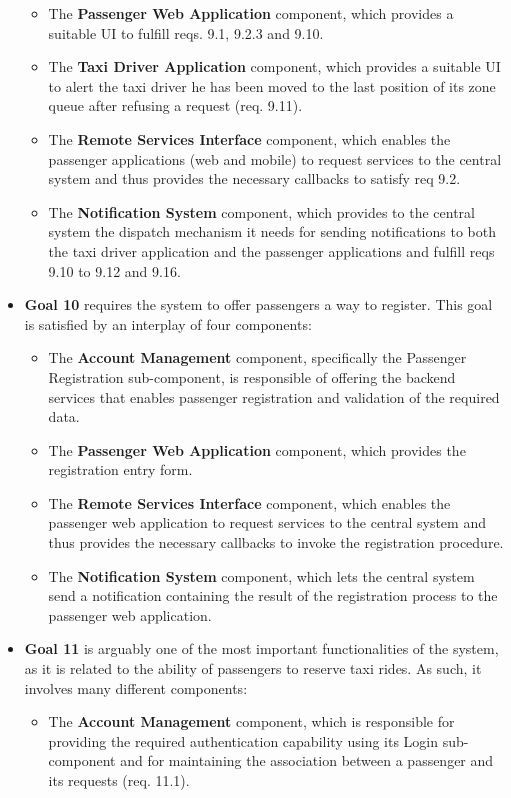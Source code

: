 \begin{itemize}
\begin{itemize}
		\item The \textbf{Passenger Web Application} component, which provides a suitable UI to fulfill reqs. 9.1, 9.2.3 and 9.10.
		\item The \textbf{Taxi Driver Application} component, which provides a suitable UI to alert the taxi driver he has been moved to the last position of its zone queue after refusing a request (req. 9.11).
		\item The \textbf{Remote Services Interface} component, which enables the passenger applications (web and mobile) to request services to the central system and thus provides the necessary callbacks to satisfy req 9.2.
		\item The \textbf{Notification System} component, which provides to the central system the dispatch mechanism it needs for sending notifications to both the taxi driver application and the passenger applications and fulfill reqs 9.10 to 9.12 and 9.16.
	\end{itemize}
	\item \textbf{Goal 10} requires the system to offer passengers a way to register. This goal is satisfied by an interplay of four components:
	\begin{itemize}
		\item The \textbf{Account Management} component, specifically the Passenger Registration sub-component, is responsible of offering the backend services that enables passenger registration and validation of the required data. 
		\item The \textbf{Passenger Web Application} component, which provides the registration entry form.
		\item The \textbf{Remote Services Interface} component, which enables the passenger web application to request services to the central system and thus provides the necessary callbacks to invoke the registration procedure.
		\item The \textbf{Notification System} component, which lets the central system send a notification containing the result of the registration process to the passenger web application.
	\end{itemize}
	\item \textbf{Goal 11} is arguably one of the most important functionalities of the system, as it is related to the ability of passengers to reserve taxi rides. As such, it involves many different components:
	\begin{itemize}
		\item The \textbf{Account Management} component, which is responsible for providing the required authentication capability using its Login sub-component and for maintaining the association between a passenger and its requests (req. 11.1).

\end{itemize}
\end{itemize}
